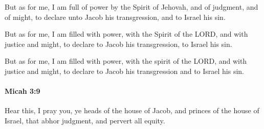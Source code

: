 			\begin{versebox}
					\item[BHS] 
					\item[LXX] 
					\item[ASV] But as for me, I am full of power by the Spirit of Jehovah, and of judgment, and of might, to declare unto Jacob his transgression, and to Israel his sin.
					\item[NIV] But as for me, I am filled with power, with the Spirit of the LORD, and with justice and might, to declare to Jacob his transgression, to Israel his sin.
					\item[NRSV] But as for me, I am filled with power, with the spirit of the LORD, and with justice and might, to declare to Jacob his transgression and to Israel his sin.
			\end{versebox}

		\paragraph{Micah 3:9} %
			\label{MICAH-3-9}

			Hear this, I pray you, ye heads of the house of Jacob, and princes of the house of Israel, that abhor judgment, and pervert all equity.

